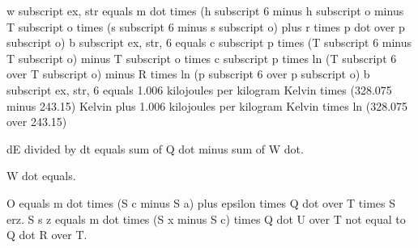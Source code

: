 w subscript ex, str equals m dot times (h subscript 6 minus h subscript o minus T subscript o times (s subscript 6 minus s subscript o) plus r times p dot over p subscript o)  
b subscript ex, str, 6 equals c subscript p times (T subscript 6 minus T subscript o) minus T subscript o times c subscript p times ln (T subscript 6 over T subscript o) minus R times ln (p subscript 6 over p subscript o)  
b subscript ex, str, 6 equals 1.006 kilojoules per kilogram Kelvin times (328.075 minus 243.15) Kelvin plus 1.006 kilojoules per kilogram Kelvin times ln (328.075 over 243.15)

dE divided by dt equals sum of Q dot minus sum of W dot.

W dot equals.

O equals m dot times (S c minus S a) plus epsilon times Q dot over T times S erz.
S s z equals m dot times (S x minus S c) times Q dot U over T not equal to Q dot R over T.